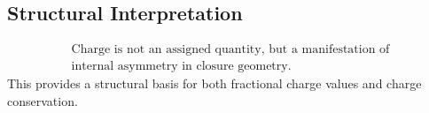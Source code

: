 \subsection{Structural Interpretation}

\begin{equation}
  \boxed{\begin{gathered}
    \text{Charge is not an assigned quantity, but a manifestation of} \\
    \text{internal asymmetry in closure geometry.}
  \end{gathered}}
\end{equation}
This provides a structural basis for both fractional charge values
and charge conservation.
